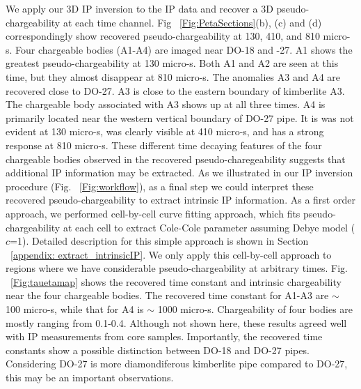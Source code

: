 \documentclass[letterpaper,11pt]{article}
\begin{document}
We apply our 3D IP inversion to the IP data and recover a 3D pseudo-chargeability at each time channel. Fig ~\ref{Fig:PetaSections}(b), (c) and (d) correspondingly show recovered pseudo-chargeability at 130, 410, and 810 micro-s. 
Four chargeable bodies (A1-A4) are imaged near DO-18 and -27. A1 shows the greatest pseudo-chargeability at 130 micro-s. Both A1 and A2 are seen at this time, but they almost disappear at 810 micro-s. The anomalies  A3 and A4 are recovered close to DO-27. A3 is close to the eastern boundary of kimberlite A3. The  chargeable body associated with A3 shows up at all three times. A4 is primarily  located near the western vertical boundary of DO-27 pipe. It is was not evident at 130 micro-s, was clearly visible at 410 micro-s, and has a strong response at 810 micro-s.  These different time decaying features of the  four chargeable bodies observed in the recovered pseudo-charegeability suggests that additional IP information may be extracted. As we illustrated in our IP inversion procedure (Fig. ~\ref{Fig:workflow}), as a final step we could interpret these recovered pseudo-chargeability to extract intrinsic IP information. As a first order approach, we performed cell-by-cell curve fitting approach, which fits pseudo-chargeability at each cell to extract Cole-Cole parameter assuming Debye model ($c$=1). Detailed description for this simple approach is shown in Section ~\ref{appendix: extract_intrinsicIP}. We only apply this cell-by-cell approach to regions where we have considerable pseudo-chargeability at arbitrary times. Fig. ~\ref{Fig:tauetamap} shows the recovered time constant and intrinsic chargeability near the four chargeable bodies. The recovered time constant for A1-A3 are $\sim$ 100 micro-s, while  that for A4 is $\sim$ 1000 micro-s. Chargeability of four bodies are mostly ranging from 0.1-0.4. Although not shown here, these results agreed well with IP measurements from core samples. Importantly, the recovered time constants show a possible distinction between DO-18 and DO-27 pipes. Considering DO-27 is more diamondiferous kimberlite pipe compared to DO-27, this may be an important observations. 
\end{document}

